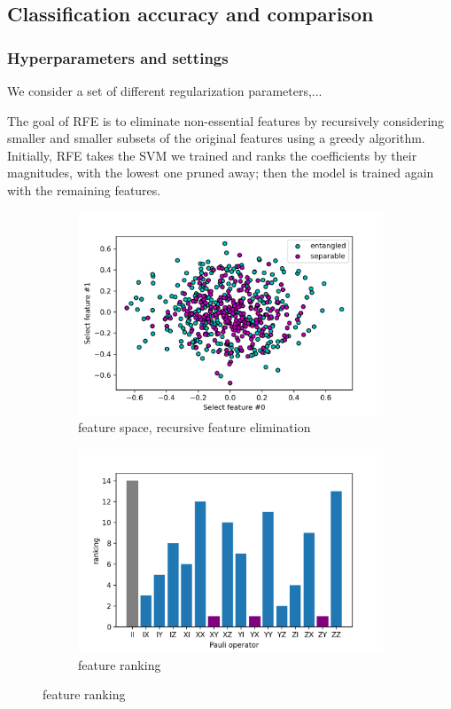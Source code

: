 \documentclass[
10pt,
aps,
pra,
linenumbers,
floatfix,
]{revtex4-2}
\theoremstyle{plain}
\theoremstyle{definition}
\begin{document}
\subsection{Classification accuracy and comparison}
\subsubsection{Hyperparameters and settings}
We consider a set of different regularization parameters,...

The goal of RFE is to eliminate non-essential features by recursively considering smaller and smaller subsets of the original features using a greedy algorithm. Initially, RFE takes the SVM we trained and ranks the coeﬃcients by their magnitudes, with the lowest one pruned away; then the model is trained again with the remaining features.
\begin{figure}[!ht]
	\centering
	\begin{subfigure}{0.49\textwidth}
	\centering
		\includegraphics[width=.9\linewidth]{./notebook/feature_space_2.png}
		\caption{feature space, recursive feature elimination}
	\end{subfigure}
	\begin{subfigure}{0.49\textwidth}
	\centering
		\includegraphics[width=.9\linewidth]{./notebook/feature_rank.png}
		\caption{feature ranking}
	\end{subfigure}
\end{figure}
\end{document}
